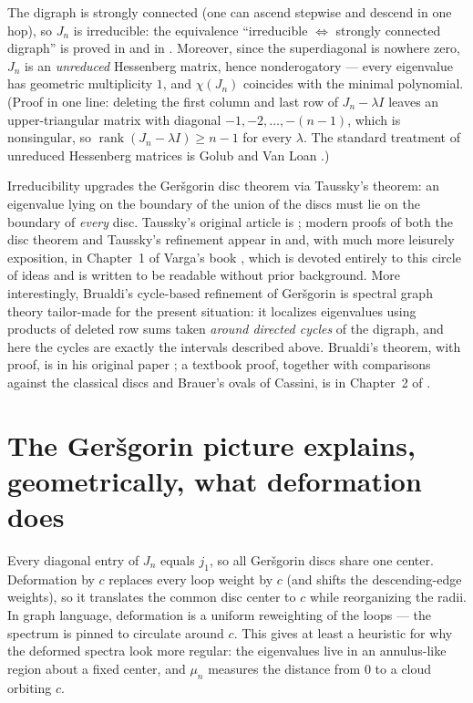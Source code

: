 \documentclass[11pt, fleqn]{amsart}
\theoremstyle{remark}
\begin{document}
The digraph is strongly connected (one can ascend stepwise and descend
in one hop), so $J_n$ is irreducible: the equivalence
``irreducible $\Leftrightarrow$ strongly connected digraph'' is proved
in \cite[Ch.~6]{HJ13} and in \cite[Ch.~2]{BP94}. Moreover, since the
superdiagonal is nowhere zero, $J_n$ is an \emph{unreduced} Hessenberg
matrix, hence nonderogatory --- every eigenvalue has geometric
multiplicity $1$, and $\chi(J_n)$ coincides with the minimal
polynomial. (Proof in one line: deleting the first column and last row
of $J_n - \lambda I$ leaves an upper-triangular matrix with diagonal
$-1, -2, \dots, -(n-1)$, which is nonsingular, so
$\operatorname{rank}(J_n - \lambda I) \ge n-1$ for every $\lambda$. The
standard treatment of unreduced Hessenberg matrices is Golub and Van
Loan \cite[\S 7.4]{GVL13}.)

Irreducibility upgrades the Ger\v{s}gorin disc theorem
\cite{Ger31} via Taussky's theorem: an eigenvalue lying on the boundary
of the union of the discs must lie on the boundary of \emph{every}
disc. Taussky's original article is \cite{Taussky49}; modern proofs of
both the disc theorem and Taussky's refinement appear in
\cite[Ch.~6]{HJ13} and, with much more leisurely exposition, in
Chapter~1 of Varga's book \cite{Varga04}, which is devoted entirely to
this circle of ideas and is written to be readable without prior
background. More interestingly, Brualdi's cycle-based refinement of
Ger\v{s}gorin is spectral graph theory tailor-made for the present
situation: it localizes eigenvalues using products of deleted row sums
taken \emph{around directed cycles} of the digraph, and here the cycles
are exactly the intervals described above. Brualdi's theorem, with
proof, is in his original paper \cite{Brualdi82}; a textbook proof,
together with comparisons against the classical discs and Brauer's
ovals of Cassini, is in Chapter~2 of \cite{Varga04}.

\section{The Ger\v{s}gorin picture explains, geometrically, what
deformation does}

Every diagonal entry of $J_n$ equals $j_1$, so all Ger\v{s}gorin discs
share one center. Deformation by $c$ replaces every loop weight by $c$
(and shifts the descending-edge weights), so it translates the common
disc center to $c$ while reorganizing the radii. In graph language,
deformation is a uniform reweighting of the loops --- the spectrum is
pinned to circulate around $c$. This gives at least a heuristic for why
the deformed spectra look more regular: the eigenvalues live in an
annulus-like region about a fixed center, and $\mu_n$ measures the
distance from $0$ to a cloud orbiting $c$.
\end{document}
